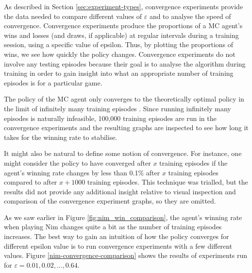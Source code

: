\documentclass[11pt,a4paper]{report}
\begin{document}
As described in Section \ref{sec:experiment-types}, convergence experiments provide the data needed to compare different values of $\varepsilon$ and to analyse the speed of convergence. Convergence experiments produce the proportions of a MC agent's wins and losses (and draws, if applicable) at regular intervals during a training session, using a specific value of epsilon. Thus, by plotting the proportions of wins, we see how quickly the policy changes. Convergence experiments do not involve any testing episodes because their goal is to analyse the algorithm during training in order to gain insight into what an appropriate number of training episodes is for a particular game.

The policy of the MC agent only converges to the theoretically optimal policy in the limit of infinitely many training episodes \cite{rl-book}. Since running infinitely many episodes is naturally infeasible, 100,000 training episodes are run in the convergence experiments and the resulting graphs are inspected to see how long it takes for the winning rate to stabilise.

It might also be natural to define some notion of convergence. For instance, one might consider the policy to have converged after $x$ training episodes if the agent's winning rate changes by less than 0.1\% after $x$ training episodes compared to after $x+1000$ training episodes. This technique was trialled, but the results did not provide any additional insight relative to visual inspection and comparison of the convergence experiment graphs, so they are omitted.

As we saw earlier in Figure \ref{fig:nim_win_comparison}, the agent's winning rate when playing Nim changes quite a bit as the number of training episodes increases. The best way to gain an intuition of how the policy converges for different epsilon value is to run convergence experiments with a few different values. Figure \ref{nim-convergence-comparison} shows the results of experiments run for $\varepsilon = 0.01, 0.02,..., 0.64$.
\end{document}
